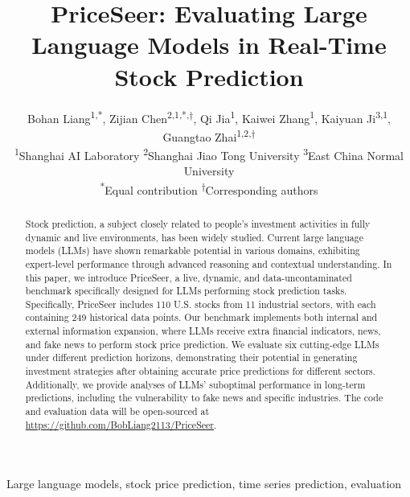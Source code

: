 \documentclass[conference]{IEEEtran}
\begin{document}
\title{PriceSeer: Evaluating Large Language Models in Real-Time Stock Prediction}

\author{Bohan Liang\textsuperscript{1,*}, Zijian Chen\textsuperscript{2,1,*,$\dag$}, Qi Jia\textsuperscript{1}, Kaiwei Zhang\textsuperscript{1}, Kaiyuan Ji\textsuperscript{3,1}, Guangtao Zhai\textsuperscript{1,2,$\dag$}
\\
\textsuperscript{1}Shanghai AI Laboratory \quad \textsuperscript{2}Shanghai Jiao Tong University \quad \textsuperscript{3}East China Normal University\\
\textsuperscript{*}Equal contribution \quad
\textsuperscript{$\dag$}Corresponding authors
}




\maketitle

\begin{abstract}
Stock prediction, a subject closely related to people's investment activities in fully dynamic and live environments, has been widely studied. Current large language models (LLMs) have shown remarkable potential in various domains, exhibiting expert-level performance through advanced reasoning and contextual understanding.
In this paper, we introduce PriceSeer, a live, dynamic, and data-uncontaminated benchmark specifically designed for LLMs performing stock prediction tasks. Specifically, PriceSeer includes 110 U.S. stocks from 11 industrial sectors, with each containing 249 historical data points. Our benchmark implements both internal and external information expansion, where LLMs receive extra financial indicators, news, and fake news to perform stock price prediction.
We evaluate six cutting-edge LLMs under different prediction horizons, demonstrating their potential in generating investment strategies after obtaining accurate price predictions for different sectors. Additionally, we provide analyses of LLMs’ suboptimal performance in long-term predictions, including the vulnerability to fake news and specific industries. The code and evaluation data will be open-sourced at \url{https://github.com/BobLiang2113/PriceSeer}.
\end{abstract}


\begin{IEEEkeywords}
Large language models, stock price prediction, time series prediction, evaluation
\end{IEEEkeywords}
\end{document}
